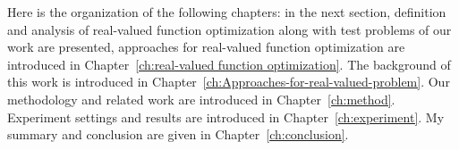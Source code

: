Here is the organization of the following chapters: in the next section,
definition and analysis of real-valued function optimization along with
test problems of our work are presented, approaches for real-valued
function optimization are introduced in Chapter~\ref{ch:real-valued
  function optimization}.
The background of this work is introduced in
Chapter~\ref{ch:Approaches-for-real-valued-problem}.
Our methodology and related work are introduced in
Chapter~\ref{ch:method}. Experiment settings and results are introduced
in Chapter~\ref{ch:experiment}.
My summary and conclusion are given in Chapter~\ref{ch:conclusion}. 

